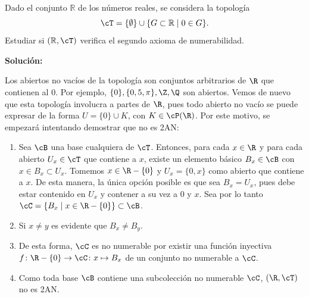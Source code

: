 \begin{ex}
    Dado el conjunto \(\mathbb{R}\) de los números reales, se considera la topología 
    \[
        \cT = \{\emptyset\} \cup \{G \subset \mathbb{R} \mid 0 \in G\}.
    \]
    Estudiar si \((\mathbb{R},\cT)\) verifica el segundo axioma de numerabilidad.
    \bigskip

    \textbf{Solución:}

    Los abiertos no vacíos de la topología son conjuntos arbitrarios de $\R$ que contienen al $0$. Por ejemplo, $\{0\}, \{0,5,\pi\}, \Z, \Q$ son abiertos. Vemos de nuevo que esta topología involucra a partes de $\R$, pues todo abierto no vacío se puede expresar de la forma $U = \{0\} \cup K$, con $K \in \cP(\R)$. Por este motivo, se empezará intentando demostrar que no es 2AN:

    \begin{enumerate}[topsep=5pt, itemsep=0pt]
        \item Sea $\cB$ una base cualquiera de $\cT$. Entonces, para cada $x \in \R$ y para cada abierto $U_x \in \cT$ que contiene a $x$, existe un elemento básico $B_x\in\cB$ con $x\in B_x \subset U_x$. Tomemos $x\in \R -\{0\}$ y $U_x = \{0,x\}$ como abierto que contiene a $x$. De esta manera, la única opción posible es que sea $B_x = U_x$, pues debe estar contenido en $U_x$ y contener a su vez a $0$ y $x$. Sea por lo tanto $\cC = \{B_x \mid x\in  \R -\{0\}\} \subset \cB$.
        \item Si $x\neq y$ es evidente que $B_x \neq B_y$.
        \item De esta forma, $\cC$ es no numerable por existir una función inyectiva $f\colon \R -\{0\}\to\cC \colon x \mapsto B_x$ de un conjunto no numerable a $\cC$.
        \item Como toda base $\cB$ contiene una subcolección no numerable $\cC$, $(\R,\cT)$ no es 2AN.
    \end{enumerate}

\end{ex}

